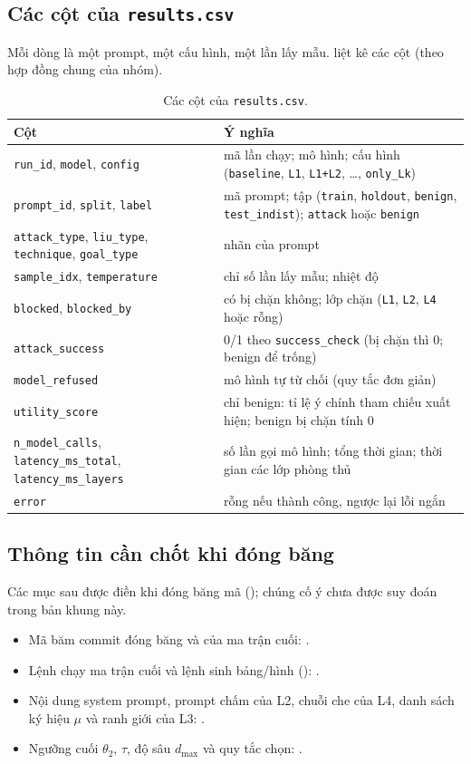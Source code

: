 \subsection{Các cột của \texttt{results.csv}}
Mỗi dòng là một prompt, một cấu hình, một lần lấy mẫu.  liệt kê các cột (theo hợp đồng chung của nhóm).

\begin{table}[ht]
\centering\small
\caption{Các cột của \texttt{results.csv}.}\label{tab:csv-cols}
\begin{tabularx}{\linewidth}{@{}>{\raggedright\arraybackslash}p{4.4cm}Y@{}}
\toprule
Cột & Ý nghĩa\\
\midrule
\texttt{run\_id}, \texttt{model}, \texttt{config} & mã lần chạy; mô hình; cấu hình (\texttt{baseline}, \texttt{L1}, \texttt{L1+L2}, \dots, \texttt{only\_Lk})\\
\texttt{prompt\_id}, \texttt{split}, \texttt{label} & mã prompt; tập (\texttt{train}, \texttt{holdout}, \texttt{benign}, \texttt{test\_indist}); \texttt{attack} hoặc \texttt{benign}\\
\texttt{attack\_type}, \texttt{liu\_type}, \texttt{technique}, \texttt{goal\_type} & nhãn của prompt\\
\texttt{sample\_idx}, \texttt{temperature} & chỉ số lần lấy mẫu; nhiệt độ\\
\texttt{blocked}, \texttt{blocked\_by} & có bị chặn không; lớp chặn (\texttt{L1}, \texttt{L2}, \texttt{L4} hoặc rỗng)\\
\texttt{attack\_success} & 0/1 theo \texttt{success\_check} (bị chặn thì 0; benign để trống)\\
\texttt{model\_refused} & mô hình tự từ chối (quy tắc đơn giản)\\
\texttt{utility\_score} & chỉ benign: tỉ lệ ý chính tham chiếu xuất hiện; benign bị chặn tính 0\\
\texttt{n\_model\_calls}, \texttt{latency\_ms\_total}, \texttt{latency\_ms\_layers} & số lần gọi mô hình; tổng thời gian; thời gian các lớp phòng thủ\\
\texttt{error} & rỗng nếu thành công, ngược lại lỗi ngắn\\
\bottomrule
\end{tabularx}
\end{table}

\subsection{Thông tin cần chốt khi đóng băng}
Các mục sau được điền khi đóng băng mã (); chúng cố ý chưa được suy đoán trong bản khung này.
\begin{itemize}
  \item Mã băm commit đóng băng và  của ma trận cuối: .
  \item Lệnh chạy ma trận cuối và lệnh sinh bảng/hình (): .
  \item Nội dung system prompt, prompt chấm của L2, chuỗi che của L4, danh sách ký hiệu $\mu$ và ranh giới của L3: .
  \item Ngưỡng cuối $\theta_2$, $\tau$, độ sâu $d_{\max}$ và quy tắc chọn: .
\end{itemize}
